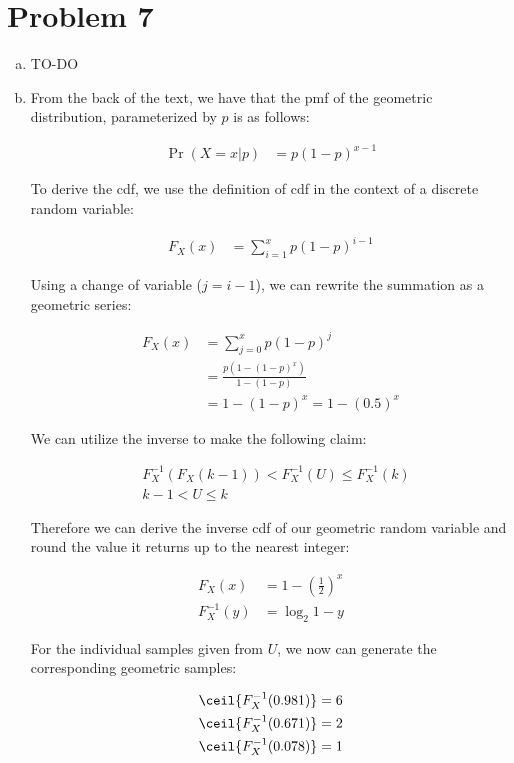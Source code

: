\documentclass[11pt]{article}
\begin{document}
\section*{Problem 7}

\begin{enumerate}[(a)]
  \item TO-DO
  \item From the back of the text, we have that the pmf of the geometric distribution, parameterized by $p$ is as follows:

    \begin{align*}
      \Pr(X = x | p) &= p(1-p)^{x-1}
    \end{align*}

    To derive the cdf, we use the definition of cdf in the context of a discrete random variable:
 
    \begin{align*}
      F_X(x) &= \sum_{i=1}^x p(1-p)^{i-1}
    \end{align*}

    Using a change of variable ($j=i-1$), we can rewrite the summation as a geometric series:

    \begin{align*}
      F_X(x) &= \sum_{j=0}^x p(1-p)^j \\
      &= \frac{p(1-(1-p)^x)}{1 - (1-p)} \\
      &= 1 - (1-p)^x = 1 - (0.5)^x
    \end{align*}

    We can utilize the inverse to make the following claim:

    \begin{align*}
      & F_X^{-1}(F_X(k-1)) < F_X^{-1}(U) \le F_X^{-1}(k) \\
      & k-1 < U \le k
    \end{align*}

    Therefore we can derive the inverse cdf of our geometric random variable and round the value it returns up to the nearest integer:

    \begin{align*}
      F_X(x) &= 1 - \left( \frac{1}{2} \right)^x \\
      F_X^{-1}(y) &= \log_2{1-y}
    \end{align*}

    For the individual samples given from $U$, we now can generate the corresponding geometric samples:

    \begin{align*}
      \ceil{F_X^{-1}(0.981)} &= 6 \\
      \ceil{F_X^{-1}(0.671)} &= 2 \\
      \ceil{F_X^{-1}(0.078)} &= 1
    \end{align*}
    
\end{enumerate}
\end{document}
